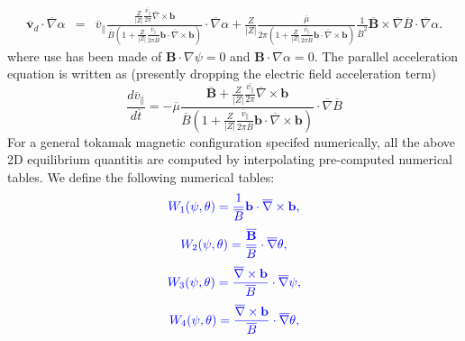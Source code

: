 \documentclass{article}
\newcommand{\tmcolor}[2]{{\color{#1}{#2}}}
\begin{document}
\begin{eqnarray}
  \overline{\mathbf{v}}_d \cdot \overline{\nabla} \alpha & = &
  \overline{v}_{\parallel} \frac{\frac{Z}{| Z |}
  \frac{\overline{v_{\parallel}}}{2 \pi} \overline{\nabla} \times
  \mathbf{b}}{\overline{B} \left( 1 + \frac{Z}{| Z |}
  \frac{\overline{v}_{\parallel}}{2 \pi \overline{B}} \mathbf{b} \cdot
  \overline{\nabla} \times \mathbf{b} \right)} \cdot \overline{\nabla} \alpha
  + \frac{Z}{| Z |} \frac{\overline{\mu}}{2 \pi \left( 1 + \frac{Z}{| Z |}
  \frac{\overline{v}_{\parallel}}{2 \pi \overline{B}} \mathbf{b} \cdot
  \overline{\nabla} \times \mathbf{b} \right)} \frac{1}{\overline{B}^2}
  \overline{\mathbf{B}} \times \overline{\nabla} \overline{B} \cdot
  \overline{\nabla} \alpha . 
\end{eqnarray}
where use has been made of $\mathbf{B} \cdot \nabla \psi = 0$ and $\mathbf{B}
\cdot \nabla \alpha = 0$. The parallel acceleration equation is written as
(presently dropping the electric field acceleration term)
\begin{equation}
  \frac{d \overline{v}_{\parallel}}{d \overline{t}} = - \overline{\mu}
  \frac{\overline{\mathbf{B}} + \frac{Z}{| Z |}
  \frac{\overline{v_{\parallel}}}{2 \pi} \overline{\nabla} \times
  \mathbf{b}}{\overline{B} \left( 1 + \frac{Z}{| Z |}
  \frac{\overline{v}_{\parallel}}{2 \pi \overline{B}} \mathbf{b} \cdot
  \overline{\nabla} \times \mathbf{b} \right)} \cdot \overline{\nabla}
  \overline{B}
\end{equation}
For a general tokamak magnetic configuration specifed numerically, all the
above 2D equilibrium quantitis are computed by interpolating pre-computed
numerical tables. We define the following numerical tables:
\begin{equation}
  \tmcolor{blue}{W_1 (\psi, \theta) = \frac{1}{\overline{B}} \mathbf{b} \cdot
  \overline{\nabla} \times \mathbf{b},}
\end{equation}
\begin{equation}
  \tmcolor{blue}{W_2 (\psi, \theta) =
  \frac{\overline{\mathbf{B}}}{\overline{B}} \cdot \overline{\nabla} \theta,}
\end{equation}
\begin{equation}
  \tmcolor{blue}{W_3 (\psi, \theta) = \frac{\overline{\nabla} \times
  \mathbf{b}}{\overline{B}} \cdot \overline{\nabla} \psi,}
\end{equation}
\begin{equation}
  \tmcolor{blue}{W_4 (\psi, \theta) = \frac{\overline{\nabla} \times
  \mathbf{b}}{\overline{B}} \cdot \overline{\nabla} \theta,}
\end{equation}
\end{document}
